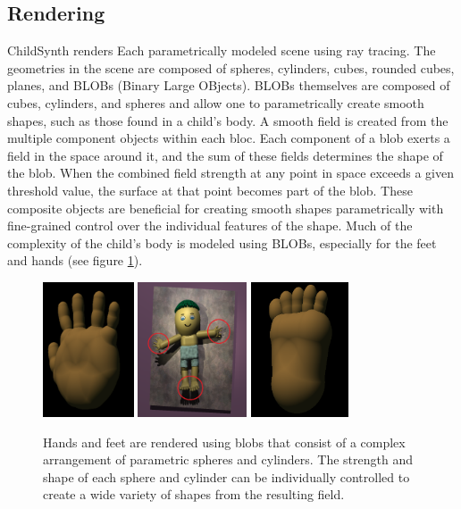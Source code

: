 \documentclass{article}
\begin{document}
\subsection{Rendering}

ChildSynth renders Each parametrically modeled scene using ray tracing. The geometries in the scene are composed of spheres, cylinders, cubes, rounded cubes, planes, and BLOBs (Binary Large OBjects). BLOBs themselves are composed of cubes, cylinders, and spheres and allow one to parametrically create smooth shapes, such as those found in a child's body. A smooth field is created from the multiple component objects within each bloc. Each component of a blob exerts a field in the space around it, and the sum of these fields determines the shape of the blob. When the combined field strength at any point in space exceeds a given threshold value, the surface at that point becomes part of the blob. These composite objects are beneficial for creating smooth shapes parametrically with fine-grained control over the individual features of the shape. Much of the complexity of the child's body is modeled using BLOBs, especially for the feet and hands (see figure \ref{fig:hand_foot}). 

\begin{figure}[htbp]
    \centering
    \includegraphics[height=4cm]{plots/hand.png}
    \includegraphics[height=4cm]{plots/back.png}
    \includegraphics[height=4cm]{plots/foot.png}
    \caption{Hands and feet are rendered using blobs that consist of a complex arrangement of parametric spheres and cylinders. The strength and shape of each sphere and cylinder can be individually controlled to create a wide variety of shapes from the resulting field.}
    \label{fig:hand_foot}
\end{figure}
\end{document}
